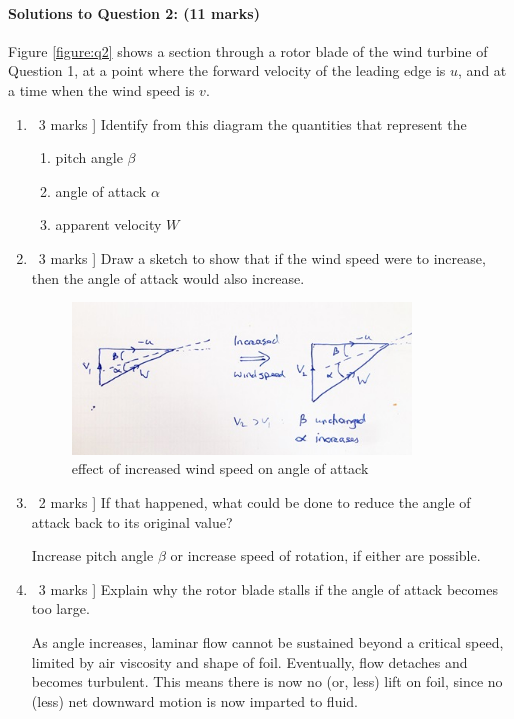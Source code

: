 \documentclass[a4paper,12pt,fleqn]{article}
\begin{document}
\paragraph{\textbf{Solutions to Question 2: (11 marks)}}
Figure \ref{figure:q2} shows a section through a rotor blade of the wind turbine of Question 1, at a point where the forward velocity
 of the leading edge is $u$, and at a time when the wind speed is $v$.

\begin{enumerate} [label=\alph*)]
\item \lbrack\ 3 marks ] Identify from this diagram the quantities that represent the 
    \begin{enumerate} [label=\roman*)]
        \item pitch angle $\beta$
        \item angle of attack $\alpha$
        \item apparent velocity $W$
    \end{enumerate}
\item \lbrack\ 3 marks ] Draw a sketch to show that if the wind speed were to increase, then the angle of attack would also increase.\par

\begin{figure}
\centering
\includegraphics[width=0.85\textwidth]{./figures/angleattack}
\caption{effect of increased wind speed on angle of attack}
\label{figure:q2sol}
\end{figure}


\item \lbrack\ 2 marks ] If that happened, what could be done to reduce the angle of attack back to its original value?\par
Increase pitch angle $\beta$ or increase speed of rotation, if either are possible.
\item \lbrack\ 3 marks ] Explain why the rotor blade stalls if the angle of attack becomes too large.\par
As angle increases, laminar flow cannot be sustained beyond a critical speed, limited by air viscosity and shape of foil. Eventually, flow detaches and becomes turbulent. This means there is now no (or, less) lift on foil, since no (less) net downward motion is now imparted to fluid.
\end{enumerate}
\end{document}
